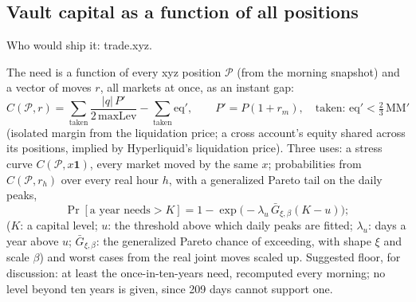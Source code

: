 \documentclass[10.5pt,a4paper]{article}
\begin{document}
\subsection{Vault capital as a function of all positions}
\par{\small\color{mute}Who would ship it: trade.xyz.}\par
The need is a function of every xyz position $\mathcal{P}$ (from the morning snapshot) and a vector of moves $r$, all markets at once, as an instant gap:
\begin{equation}
C(\mathcal{P}, r) = \sum_{\text{taken}} \frac{|q|\,P'}{2\,\text{maxLev}} - \sum_{\text{taken}} \text{eq}',\qquad P' = P(1+r_m),\quad \text{taken: eq}' < \tfrac23\,\text{MM}'
\end{equation}
(isolated margin from the liquidation price; a cross account's equity shared across its positions, implied by Hyperliquid's liquidation price). Three uses: a stress curve $C(\mathcal{P}, x\mathbf{1})$, every market moved by the same $x$; probabilities from $C(\mathcal{P}, r_h)$ over every real hour $h$, with a generalized Pareto tail on the daily peaks,
\begin{equation}
\Pr[\text{a year needs} > K] = 1 - \exp\!\bigl(-\lambda_u\, \bar G_{\xi,\beta}(K-u)\bigr);
\end{equation}
($K$: a capital level; $u$: the threshold above which daily peaks are fitted; $\lambda_u$: days a year above $u$; $\bar G_{\xi,\beta}$: the generalized Pareto chance of exceeding, with shape $\xi$ and scale $\beta$)
and worst cases from the real joint moves scaled up. Suggested floor, for discussion: at least the once-in-ten-years need, recomputed every morning; no level beyond ten years is given, since 209 days cannot support one.
\end{document}
